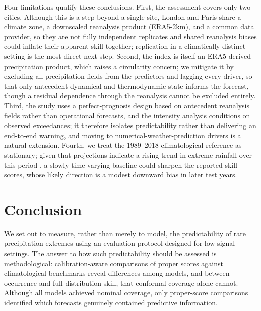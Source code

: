 \documentclass[11pt,a4paper]{article}
\begin{document}
Four limitations qualify these conclusions. First, the assessment covers only two cities. Although this is a step beyond a single site, London and Paris share a climate zone, a downscaled reanalysis product (ERA5-2km), and a common data provider, so they are not fully independent replicates and shared reanalysis biases could inflate their apparent skill together; replication in a climatically distinct setting is the most direct next step. Second, the index is itself an ERA5-derived precipitation product, which raises a circularity concern; we mitigate it by excluding all precipitation fields from the predictors and lagging every driver, so that only antecedent dynamical and thermodynamic state informs the forecast, though a residual dependence through the reanalysis cannot be excluded entirely. Third, the study uses a perfect-prognosis design based on antecedent reanalysis fields rather than operational forecasts, and the intensity analysis conditions on observed exceedances; it therefore isolates predictability rather than delivering an end-to-end warning, and moving to numerical-weather-prediction drivers is a natural extension. Fourth, we treat the 1989--2018 climatological reference as stationary; given that projections indicate a rising trend in extreme rainfall over this period \citep{ipcc2021}, a slowly time-varying baseline could sharpen the reported skill scores, whose likely direction is a modest downward bias in later test years.

\section{Conclusion}\label{sec:conclusion}

We set out to measure, rather than merely to model, the predictability of rare
precipitation extremes using an evaluation protocol designed for low-signal
settings. The answer to how such predictability should be assessed is
methodological: calibration-aware comparisons of proper scores against
climatological benchmarks reveal differences among models, and between
occurrence and full-distribution skill, that conformal coverage alone cannot.
Although all models achieved nominal coverage, only proper-score comparisons
identified which forecasts genuinely contained predictive information.
\end{document}
